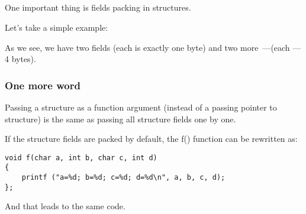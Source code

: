 \subsection{\StructurePackingSectionName}
\label{structure_packing}

One important thing is fields packing in structures.

Let's take a simple example:



As we see, we have two \Tchar fields (each is exactly one byte) and two more~---\Tint (each --- 4 bytes).





\subsubsection{One more word}

Passing a structure as a function argument (instead of a passing pointer to structure) is the same
as passing all structure fields one by one.

If the structure fields are packed by default, the f() function can be rewritten as:

\begin{lstlisting}[style=customc]
void f(char a, int b, char c, int d)
{
    printf ("a=%d; b=%d; c=%d; d=%d\n", a, b, c, d);
};
\end{lstlisting}

And that leads to the same code.
